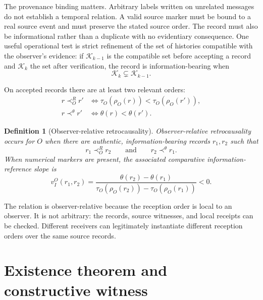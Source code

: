 \documentclass[11pt]{article}
\newtheorem{definition}{Definition}[section]
\theoremstyle{remark}
\newcommand{\receive}{\prec_{\!O}^{R}}
\newcommand{\sourceorder}{\prec^{\theta}}
\begin{document}
The provenance binding matters. Arbitrary labels written on unrelated
messages do not establish a temporal relation. A valid source marker must be
bound to a real source event and must preserve the stated source order. The
record must also be informational rather than a duplicate with no evidentiary
consequence. One useful operational test is strict refinement of the set of
histories compatible with the observer's evidence: if $\mathcal{K}_{k-1}$ is
the compatible set before accepting a record and $\mathcal{K}_k$ the set after
verification, the record is information-bearing when
\begin{equation}
  \mathcal{K}_k\subsetneq\mathcal{K}_{k-1}.
  \label{eq:information}
\end{equation}

On accepted records there are at least two relevant orders:
\begin{align}
 r\receive r' &\Longleftrightarrow
   \tau_O(\rho_O(r))<\tau_O(\rho_O(r')),\\
 r\sourceorder r' &\Longleftrightarrow
   \theta(r)<\theta(r').
\end{align}

\begin{definition}[Observer-relative retrocausality]
\label{def:orr}
Observer-relative retrocausality occurs for $O$ when there are authentic,
information-bearing records $r_1,r_2$ such that
\begin{equation}
  r_1\receive r_2\qquad\text{and}\qquad r_2\sourceorder r_1.
  \label{eq:inverseorders}
\end{equation}
When numerical markers are present, the associated comparative
information-reference slope is
\begin{equation}
  v_I^O(r_1,r_2)=
  \frac{\theta(r_2)-\theta(r_1)}
       {\tau_O(\rho_O(r_2))-\tau_O(\rho_O(r_1))}<0.
  \label{eq:slope}
\end{equation}
\end{definition}

The relation is observer-relative because the reception order is local to an
observer. It is not arbitrary: the records, source witnesses, and local
receipts can be checked. Different receivers can legitimately instantiate
different reception orders over the same source records.

\section{Existence theorem and constructive witness}
\label{sec:theorem}
\end{document}
